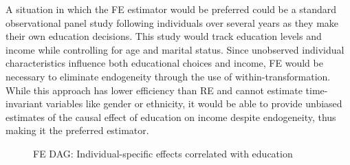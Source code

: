 \newpage

A situation in which the FE estimator would be preferred could be a standard observational panel study following individuals over several years as they make their own education decisions. This study would track education levels and income while controlling for age and marital status. Since unobserved individual characteristics influence both educational choices and income, FE would be necessary to eliminate endogeneity through the use of within-transformation. While this approach has lower efficiency than RE and cannot estimate time-invariant variables like gender or ethnicity, it would be able to provide unbiased estimates of the causal effect of education on income despite endogeneity, thus making it the preferred estimator.

\begin{figure}[H]
\centering
{}
\caption{FE DAG: Individual-specific effects correlated with education}
\label{fig:fe_dag}
\end{figure}
\vspace{-2em}